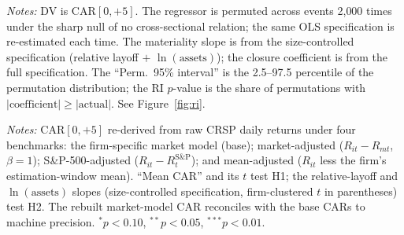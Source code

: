 \documentclass[12pt]{article}
\begin{document}
\begin{table}[htbp]\centering
\begin{threeparttable}
\caption{Randomization inference (2{,}000 permutations of the regressor)}\label{tab:randinf}\small

\begin{tablenotes}\small\item \textit{Notes:} DV is CAR$[0,+5]$. The regressor is
permuted across events 2{,}000 times under the sharp null of no cross-sectional
relation; the same OLS specification is re-estimated each time. The materiality
slope is from the size-controlled specification (relative layoff $+$
$\ln(\text{assets})$); the closure coefficient is from the full specification. The
``Perm.\ 95\% interval'' is the 2.5--97.5 percentile of the permutation
distribution; the RI $p$-value is the share of permutations with
$|\text{coefficient}|\geq|\text{actual}|$. See Figure~\ref{fig:ri}.
\end{tablenotes}
\end{threeparttable}
\end{table}

\begin{table}[htbp]\centering
\begin{threeparttable}
\caption{Alternative abnormal-return benchmarks}\label{tab:altbench}\small

\begin{tablenotes}\small\item \textit{Notes:} CAR$[0,+5]$ re-derived from raw CRSP
daily returns under four benchmarks: the firm-specific market model (base);
market-adjusted ($R_{it}-R_{mt}$, $\beta{=}1$); S\&P-500-adjusted
($R_{it}-R^{\text{S\&P}}_t$); and mean-adjusted ($R_{it}$ less the firm's
estimation-window mean). ``Mean CAR'' and its $t$ test H1; the relative-layoff and
$\ln(\text{assets})$ slopes (size-controlled specification, firm-clustered $t$ in
parentheses) test H2. The rebuilt market-model CAR reconciles with the base CARs
to machine precision. $^{*}p<0.10$, $^{**}p<0.05$, $^{***}p<0.01$.
\end{tablenotes}
\end{threeparttable}
\end{table}
\end{document}
